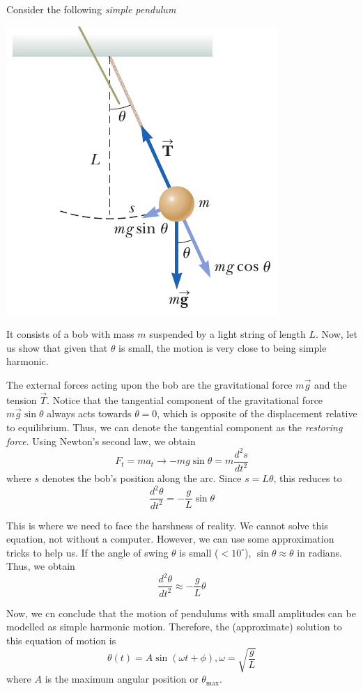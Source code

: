 Consider the following \textit{simple pendulum}
\begin{center}
\includegraphics[scale=0.6]{images/oaw/pendulum01.png}
\end{center}
It consists of a bob with mass $m$ suspended by a light string of length $L$. Now, let us
show that given that $\theta$ is small, the motion is very close to being simple harmonic.

The external forces acting upon the bob are the gravitational force $m\vec{g}$ and the tension
$\vec{T}$. Notice that the tangential component of the gravitational force $m\vec{g}\sin\theta$
always acts towards $\theta = 0$, which is opposite of the displacement relative to equilibrium.
Thus, we can denote the tangential component as the \textit{restoring force}. Using Newton's 
second law, we obtain
\[ F_t = ma_t \rightarrow -mg\sin\theta = m\frac{d^2s}{dt^2} \] 
where $s$ denotes the bob's position along the arc. Since $s = L\theta$, this reduces to
\[ \frac{d^2\theta}{dt^2} = - \frac{g}{L}\sin\theta \]

This is where we need to face the harshness of reality. We cannot solve this equation, not without
a computer. However, we can use some approximation tricks to help us. If the angle of swing $\theta$ 
is small ($< 10^\circ$), $\sin\theta \approx \theta$ in radians. Thus, we obtain
\begin{equation}
    \frac{d^2\theta}{dt^2} \approx -\frac{g}{L}\theta
\end{equation}

Now, we cn conclude that the motion of pendulums with small amplitudes can be modelled as simple 
harmonic motion. Therefore, the (approximate) solution to this equation of motion is
\begin{equation}
    \theta(t) = A\sin(\omega t + \phi), \omega = \sqrt{\frac{g}{L}}
\end{equation}
where $A$ is the maximum angular position or $\theta_{\max}$.

